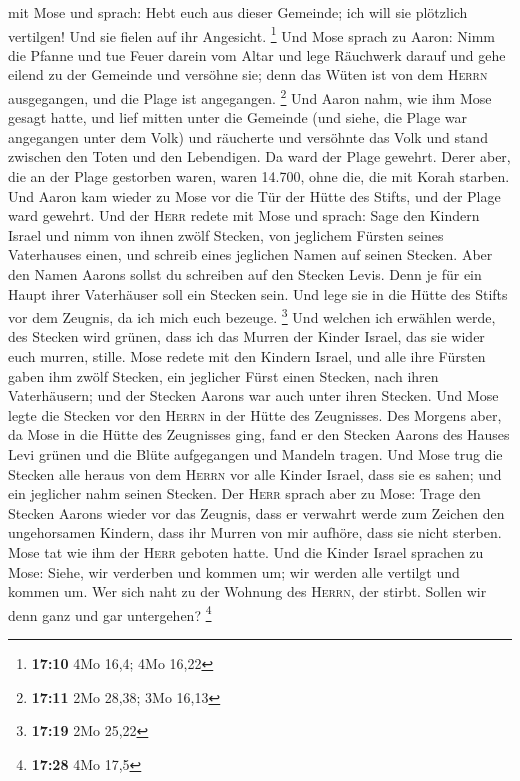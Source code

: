 mit Mose und sprach:  Hebt euch aus dieser Gemeinde; ich
will sie plötzlich vertilgen! Und sie fielen auf ihr Angesicht.
\footnote{\textbf{17:10} 4Mo 16,4; 4Mo 16,22}  Und Mose
sprach zu Aaron: Nimm die Pfanne und tue Feuer darein vom Altar und lege
Räuchwerk darauf und gehe eilend zu der Gemeinde und versöhne sie; denn
das Wüten ist von dem \textsc{Herrn} ausgegangen, und die Plage ist
angegangen. \footnote{\textbf{17:11} 2Mo 28,38; 3Mo 16,13}
 Und Aaron nahm, wie ihm Mose gesagt hatte, und lief
mitten unter die Gemeinde (und siehe, die Plage war angegangen unter dem
Volk) und räucherte und versöhnte das Volk  und stand
zwischen den Toten und den Lebendigen. Da ward der Plage gewehrt.
 Derer aber, die an der Plage gestorben waren, waren
14.700, ohne die, die mit Korah starben.  Und Aaron kam
wieder zu Mose vor die Tür der Hütte des Stifts, und der Plage ward
gewehrt.  Und der \textsc{Herr} redete mit Mose und
sprach:  Sage den Kindern Israel und nimm von ihnen zwölf
Stecken, von jeglichem Fürsten seines Vaterhauses einen, und schreib
eines jeglichen Namen auf seinen Stecken.  Aber den Namen
Aarons sollst du schreiben auf den Stecken Levis. Denn je für ein Haupt
ihrer Vaterhäuser soll ein Stecken sein.  Und lege sie in
die Hütte des Stifts vor dem Zeugnis, da ich mich euch bezeuge.
\footnote{\textbf{17:19} 2Mo 25,22}  Und welchen ich
erwählen werde, des Stecken wird grünen, dass ich das Murren der Kinder
Israel, das sie wider euch murren, stille.  Mose redete
mit den Kindern Israel, und alle ihre Fürsten gaben ihm zwölf Stecken,
ein jeglicher Fürst einen Stecken, nach ihren Vaterhäusern; und der
Stecken Aarons war auch unter ihren Stecken.  Und Mose
legte die Stecken vor den \textsc{Herrn} in der Hütte des Zeugnisses.
 Des Morgens aber, da Mose in die Hütte des Zeugnisses
ging, fand er den Stecken Aarons des Hauses Levi grünen und die Blüte
aufgegangen und Mandeln tragen.  Und Mose trug die
Stecken alle heraus von dem \textsc{Herrn} vor alle Kinder Israel, dass
sie es sahen; und ein jeglicher nahm seinen Stecken.  Der
\textsc{Herr} sprach aber zu Mose: Trage den Stecken Aarons wieder vor
das Zeugnis, dass er verwahrt werde zum Zeichen den ungehorsamen
Kindern, dass ihr Murren von mir aufhöre, dass sie nicht sterben.
 Mose tat wie ihm der \textsc{Herr} geboten hatte.
 Und die Kinder Israel sprachen zu Mose: Siehe, wir
verderben und kommen um; wir werden alle vertilgt und kommen um.
 Wer sich naht zu der Wohnung des \textsc{Herrn}, der
stirbt. Sollen wir denn ganz und gar untergehen? \footnote{\textbf{17:28}
  4Mo 17,5}

